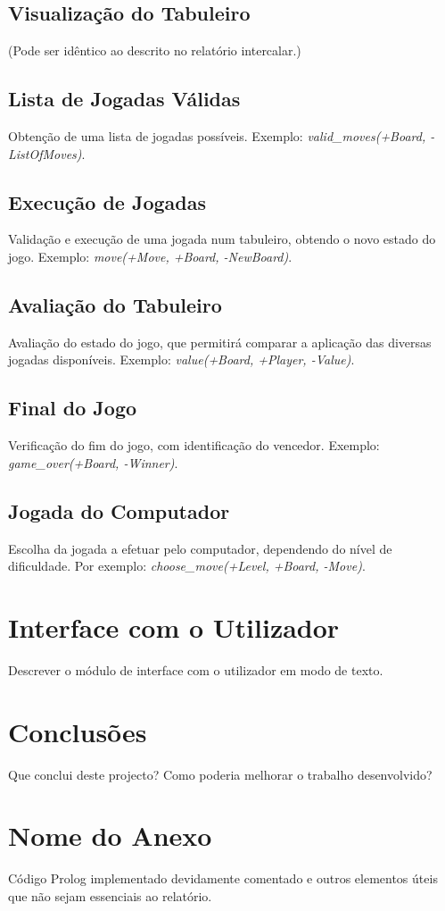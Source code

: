 \documentclass[a4paper]{article}
\begin{document}
\subsection{Visualização do Tabuleiro} (Pode ser idêntico ao descrito no relatório intercalar.)

\subsection{Lista de Jogadas Válidas} Obtenção de uma lista de jogadas possíveis. Exemplo: \textit{valid\_moves(+Board, -ListOfMoves)}.

\subsection{Execução de Jogadas} Validação e execução de uma jogada num tabuleiro, obtendo o novo estado do jogo. Exemplo: \textit{move(+Move, +Board, -NewBoard)}.

\subsection{Avaliação do Tabuleiro} Avaliação do estado do jogo, que permitirá comparar a aplicação das diversas jogadas disponíveis. Exemplo: \textit{value(+Board, +Player, -Value)}.

\subsection{Final do Jogo} Verificação do fim do jogo, com identificação do vencedor. Exemplo: \textit{game\_over(+Board, -Winner)}.

\subsection{Jogada do Computador} Escolha da jogada a efetuar pelo computador, dependendo do nível de dificuldade. Por exemplo: \textit{choose\_move(+Level, +Board, -Move)}.


\section{Interface com o Utilizador}

Descrever o módulo de interface com o utilizador em modo de texto.


\section{Conclusões}
Que conclui deste projecto? Como poderia melhorar o trabalho desenvolvido?


\clearpage
{}
\renewcommand\refname{Bibliografia}



\newpage
\appendix
\section{Nome do Anexo}
Código Prolog implementado devidamente comentado e outros elementos úteis que não sejam essenciais ao relatório.
\end{document}

